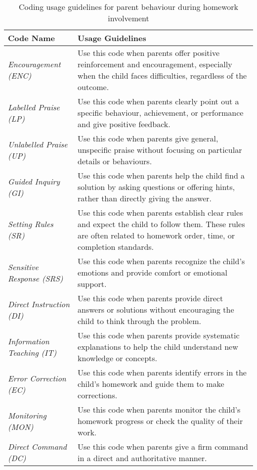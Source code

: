 \begin{table}[h]
\centering
\footnotesize
\caption{Coding usage guidelines for parent behaviour during homework involvement}
\label{appen:tab:behaviour}
\begin{tabular}{p{} p{}}
\toprule
\textbf{Code Name} & \textbf{Usage Guidelines} \\ \midrule
\textit{Encouragement (ENC)} & Use this code when parents offer positive reinforcement and encouragement, especially when the child faces difficulties, regardless of the outcome. \\ \hline
\textit{Labelled Praise (LP)} & Use this code when parents clearly point out a specific behaviour, achievement, or performance and give positive feedback. \\ \hline
\textit{Unlabelled Praise (UP)} & Use this code when parents give general, unspecific praise without focusing on particular details or behaviours. \\ \hline
\textit{Guided Inquiry (GI)} & Use this code when parents help the child find a solution by asking questions or offering hints, rather than directly giving the answer. \\ \hline
\textit{Setting Rules (SR)} & Use this code when parents establish clear rules and expect the child to follow them. These rules are often related to homework order, time, or completion standards. \\ \hline
\textit{Sensitive Response (SRS)} & Use this code when parents recognize the child's emotions and provide comfort or emotional support. \\ \hline
\textit{Direct Instruction (DI)} & Use this code when parents provide direct answers or solutions without encouraging the child to think through the problem. \\ \hline
\textit{Information Teaching (IT)} & Use this code when parents provide systematic explanations to help the child understand new knowledge or concepts. \\ \hline
\textit{Error Correction (EC)} & Use this code when parents identify errors in the child's homework and guide them to make corrections. \\ \hline
\textit{Monitoring (MON)} & Use this code when parents monitor the child's homework progress or check the quality of their work. \\ \hline
\textit{Direct Command (DC)} & Use this code when parents give a firm command in a direct and authoritative manner. \\ \hline

\end{tabular}
\end{table}
